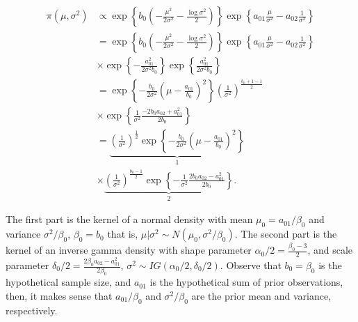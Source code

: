 \begin{enumerate}
\begin{align}
	\pi(\mu,\sigma^2)&\propto \exp\left\{b_0\left(-\frac{\mu^2}{2\sigma^2}-\frac{\log \sigma^2}{2}\right)\right\}\exp\left\{a_{01}\frac{\mu}{\sigma^2}-a_{02}\frac{1}{\sigma^2}\right\}\nonumber\\
	&=\exp\left\{b_0\left(-\frac{\mu^2}{2\sigma^2}-\frac{\log \sigma^2}{2}\right)\right\}\exp\left\{a_{01}\frac{\mu}{\sigma^2}-a_{02}\frac{1}{\sigma^2}\right\}\nonumber\\
	&\times \exp\left\{-\frac{a_{01}^2}{2\sigma^2b_0}\right\}\exp\left\{\frac{a_{01}^2}{2\sigma^2b_0}\right\}\nonumber\\
	&=\exp\left\{-\frac{b_0}{2\sigma^2}\left(\mu-\frac{a_{01}}{b_0}\right)^2\right\}\left(\frac{1}{\sigma^2}\right)^{\frac{b_0+1-1}{2}}\nonumber\\
	&\times \exp\left\{\frac{1}{\sigma^2}\frac{-2b_0a_{02}+a_{01}^2}{2b_0}\right\}\nonumber\\
	&=\underbrace{\left(\frac{1}{\sigma^2}\right)^{\frac{1}{2}}\exp\left\{-\frac{b_0}{2\sigma^2}\left(\mu-\frac{a_{01}}{b_0}\right)^2\right\}}_{1}\nonumber\\
	&\times\underbrace{\left(\frac{1}{\sigma^2}\right)^{\frac{b_0-1}{2}}\exp\left\{-\frac{1}{\sigma^2}\frac{2b_0a_{02}-a_{01}^2}{2b_0}\right\}}_{2}.\nonumber
\end{align}

The first part is the kernel of a normal density with mean $\mu_0=a_{01}/\beta_0$ and variance $\sigma^2/\beta_0$, $\beta_0=b_0$ that is, $\mu|\sigma^2\sim N(\mu_0,\sigma^2/\beta_0)$. The second part is the kernel of an inverse gamma density with shape parameter $\alpha_0/2=\frac{\beta_0-3}{2}$, and scale parameter $\delta_0/2=\frac{2\beta_0a_{02}-a_{01}^2}{2\beta_0}$, $\sigma^2\sim IG(\alpha_0/2,\delta_0/2)$. Observe that $b_0=\beta_0$ is the hypothetical sample size, and $a_{01}$ is the hypothetical sum of prior observations, then, it makes sense that $a_{01}/\beta_0$ and $\sigma^2/\beta_0$ are the prior mean and variance, respectively. 


\end{enumerate}
